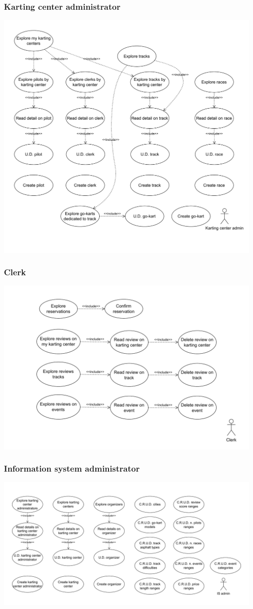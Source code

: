 \documentclass{beamer}
\begin{document}
\begin{frame}
    \frametitle{Karting center administrator}
    \centering
    \includegraphics[width=0.7\linewidth]{drawio/karting-center-admin.pdf}
\end{frame}

\begin{frame}
    \frametitle{Clerk}
    \centering
    \includegraphics[width=0.9\linewidth]{drawio/clerk.pdf}
\end{frame}

\begin{frame}
    \frametitle{Information system administrator}
    \centering
    \includegraphics[width=0.7\linewidth]{drawio/is-admin.pdf}
\end{frame}
\end{document}
